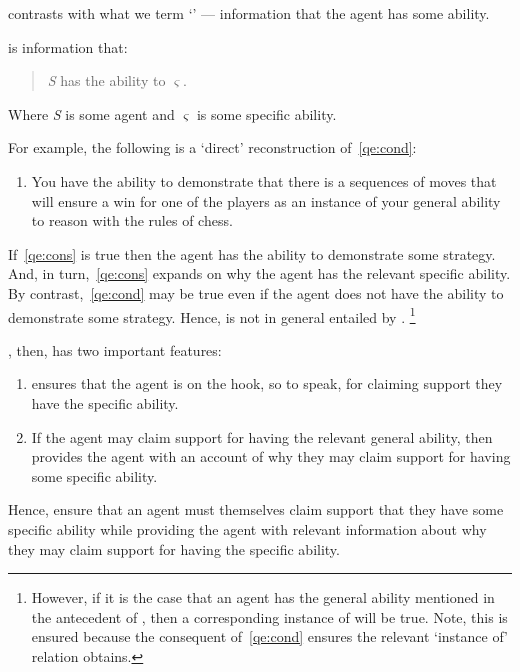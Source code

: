 \begin{note}
  \Gsi{} contrasts with what we term `\dsi{-}' --- information that the agent has some ability.
  \begin{definition}[\dsi{}]
    \Dsi{-} is information that:
    \begin{quote}
      \emph{S} has the ability to \(\varsigma\).
    \end{quote}
    Where \emph{S} is some agent and \(\varsigma\) is some specific ability.
  \end{definition}
  For example, the following is a `direct' reconstruction of~\ref{qe:cond}:

  \begin{enumerate}[label=(\dsi{}:\arabic*), ref=(\dsi{}:\arabic*), series=dsi_count]
  \item\label{qe:cons} You have the ability to demonstrate that there is a sequences of moves that will ensure a win for one of the players as an instance of your general ability to reason with the rules of chess.
  \end{enumerate}

  If~\ref{qe:cons} is true then the agent has the ability to demonstrate some strategy.
  And, in turn,~\ref{qe:cons} expands on why the agent has the relevant specific ability.
  By contrast,~\ref{qe:cond} may be true even if the agent does not have the ability to demonstrate some strategy.
  Hence, \dsi{} is not in general entailed by \gsi{}.\nolinebreak
  \footnote{
    However, if it is the case that an agent has the general ability mentioned in the antecedent of \gsi{}, then a corresponding instance of \dsi{} will be true.
    Note, this is ensured because the consequent of~\ref{qe:cond} ensures the relevant `instance of' relation obtains.
  }
\end{note}

\begin{note}
  \gsi{}, then, has two important features:
  \begin{enumerate}
  \item \gsi{} ensures that the agent is on the hook, so to speak, for claiming support they have the specific ability.
  \item If the agent may claim support for having the relevant general ability, then \gsi{} provides the agent with an account of why they may claim support for having some specific ability.
  \end{enumerate}
  Hence, \gsi{} ensure that an agent must themselves claim support that they have some specific ability while providing the agent with relevant information about why they may claim support for having the specific ability.
\end{note}

